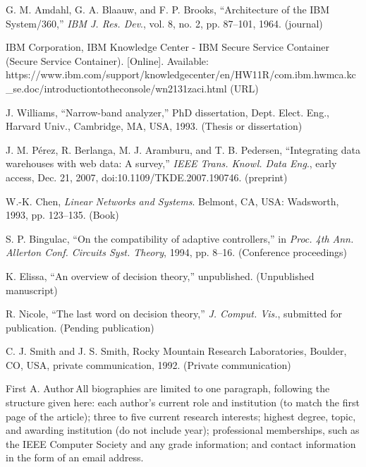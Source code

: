 \documentclass{IEEEcsmag}
\begin{document}
\begin{thebibliography}{1}

G. M. Amdahl, G. A. Blaauw, and F. P. Brooks, ``Architecture of the IBM System/360,'' {\it IBM J. Res. Dev}., vol. 8, no. 2, pp. 87--101, 1964. (journal)

IBM Corporation, IBM Knowledge Center - IBM Secure Service Container (Secure Service Container). [Online]. Available: {https://www.ibm.com/support/\break knowledgecenter/en/HW11R/com.ibm.hwmca.kc\_se.doc/\break introductiontotheconsole/wn2131zaci.html} (URL)

J. Williams, ``Narrow-band analyzer,'' PhD dissertation, Dept.  Elect. Eng., Harvard Univ., Cambridge, MA, USA, 1993. (Thesis or dissertation)

J. M. P\'erez, R. Berlanga, M. J. Aramburu, and T. B. Pedersen, ``Integrating data warehouses with web data: A survey,'' {\it IEEE Trans. Knowl. Data Eng}., early access, Dec. 21, 2007, doi:10.1109/TKDE.2007.190746. (preprint)

W.-K. Chen, {\it Linear Networks and Systems}. Belmont, CA, USA: Wadsworth,  1993, pp. 123--135. (Book)

S. P. Bingulac, ``On the compatibility of adaptive controllers,'' in {\it Proc. 4th Ann. Allerton Conf. Circuits Syst. Theory}, 1994,  pp. 8--16. (Conference proceedings)

K. Elissa, ``An overview of decision theory,'' unpublished. (Unpublished manuscript)

R. Nicole, ``The last word on decision theory,'' {\it J. Comput. Vis.}, submitted for publication. (Pending publication)

C. J. Smith and J. S. Smith, Rocky Mountain Research Laboratories, Boulder, CO, USA, private communication, 1992. (Private communication)
\end{thebibliography}\vspace*{-8pt}


\begin{IEEEbiography}{First A. Author}{\,}All biographies are limited to one paragraph, following the structure given here: each author's current role and institution (to match the first page of the article); three to  five current research interests; highest degree, topic, and awarding institution (do not include year); professional memberships, such as the IEEE Computer Society and any grade information; and contact information in the form of an email address.\vadjust{\vfill\pagebreak}
\end{IEEEbiography}
\end{document}
